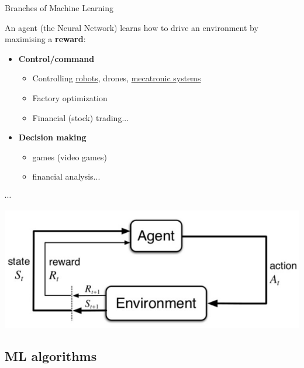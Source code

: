 \documentclass[10pt,serif,mathserif,compress,hyperref={colorlinks}]{beamer}
\begin{document}
\begin{frame}{Branches of Machine Learning}  
  \begin{tcolorbox}[title={\bf Deep Reinforcement Learning} DRL]
    An agent (the Neural Network) learns how to drive an environment by maximising a \textbf{reward}:
    \begin{itemize}

    \item \textbf{Control/command}
      \begin{itemize}
      \item Controlling \href{run:./videos/trained-PPO-example.webm}{robots}, drones, \href{run:./videos/DRL-Cartpol.webm}{mecatronic systems}
      \item Factory optimization
      \item Financial (stock) trading...
      \end{itemize}        
    \item \textbf{Decision making}
      \begin{itemize}
      \item games (video games)
      \item financial analysis...
      \end{itemize}
    \end{itemize}
    \vspace*{-1mm}$\cdots$
  \end{tcolorbox}

  \begin{minipage}{\textwidth}
    \vspace*{-28mm}\hspace*{50mm}\includegraphics[width=.6\textwidth]{images/DRL.png}
  \end{minipage}

  \vfill
\end{frame}

\subsection{ML algorithms}
\end{document}
